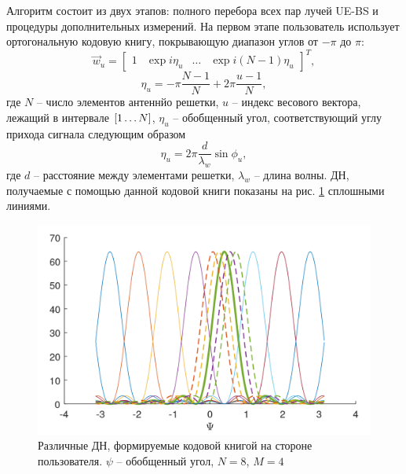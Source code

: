 Алгоритм состоит из двух этапов: полного перебора всех пар лучей UE-BS и
процедуры дополнительных измерений.
На первом этапе пользователь использует ортогональную кодовую книгу, покрывающую
диапазон углов от $-\pi$ до $\pi$:
\begin{equation}
    \label{eq:4.16}
    \vec w_u =
    \begin{bmatrix}
        1 & \exp {i \eta_u} & \dots & \exp{i(N-1)\eta_u}
    \end{bmatrix}^T,
\end{equation}
\begin{equation}
    \label{eq:4.17}
    \eta_u = -\pi \frac{N-1}{N} + 2\pi \frac{u-1}{N},
\end{equation}
где $N$ -- число элементов антеннйо решетки, $u$ -- индекс весового вектора, лежащий в интервале $\qty[1 \dots N]$, $\eta_u$ -- обобщенный угол, соответствующий углу прихода сигнала следующим образом
\begin{equation}
    \eta_u = 2\pi \frac{d}{\lambda_w}\sin\phi_u,
\end{equation}
где $d$ -- расстояние между элементами решетки, $\lambda_w$ -- длина волны. ДН,
получаемые с помощью данной кодовой книги показаны на рис. \ref{fig:4.9}
сплошными линиями.
\begin{figure}[ht]
    \centering
    \includegraphics[width=0.5\linewidth]{figs/fig4.8.png}
    \caption{Различные ДН, формируемые кодовой книгой на стороне пользователя. $\psi$ -- обобщенный угол, $N=8$, $M=4$}
    \label{fig:4.9}
\end{figure}

